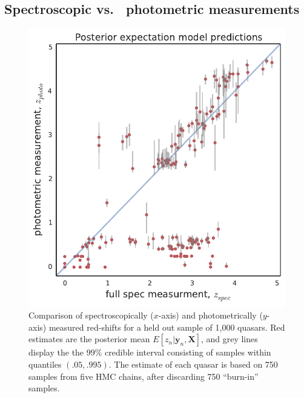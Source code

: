 \documentclass{article}
\begin{document}
\subsection{Spectroscopic vs.~ photometric measurements}
\begin{figure}[ht]
\vskip 0.2in
\begin{center}
\centerline{\includegraphics[width=\columnwidth]{../figs/red-shift-test-predictions}}
\vskip -0.2in
\caption{Comparison of spectroscopically ($x$-axis) and photometrically ($y$-axis) measured red-shifts for a held out sample of 1,000 quasars.  Red estimates are the posterior mean $E[z_n | \mathbf{y}_n, \mathbf{X}]$, and grey lines display the the 99\% credible interval consisting of samples within quantiles $(.05, .995)$.  The estimate of each quasar is based on 750 samples from five HMC chains, after discarding 750 ``burn-in'' samples. }
\label{fig:frames}
\end{center}
\end{figure}
\end{document}
